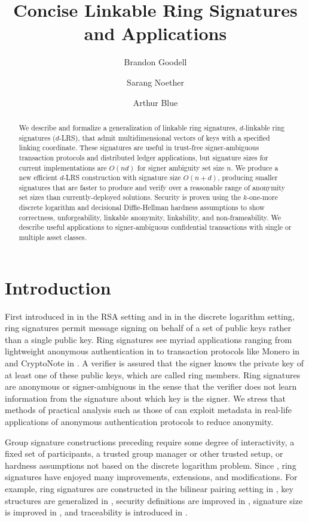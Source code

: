 \documentclass[draft]{llncs} %
\title{Concise Linkable Ring Signatures and Applications}
\institute{Monero Research Lab, \email{\{surae,sarang\}.noether@protonmail.com} \and Independent researcher, \email{randomrun@protonmail.com}}
\author{Brandon Goodell\inst{1} \and Sarang Noether\inst{1} \and Arthur Blue\inst{2}}
\begin{document}
\maketitle


\begin{abstract}
We describe and formalize a generalization of linkable ring signatures, $d$-linkable ring signatures ($d$-LRS), that admit multidimensional vectors of keys with a specified linking coordinate. These signatures are useful in trust-free signer-ambiguous transaction protocols and distributed ledger applications, but signature sizes for current implementations are $O(nd)$ for signer ambiguity set size $n$. We produce a new efficient $d$-LRS construction with signature size $O(n + d)$, producing smaller signatures that are faster to produce and verify over a reasonable range of anonymity set sizes than currently-deployed solutions. Security is proven using the $k$-one-more discrete logarithm and decisional Diffie-Hellman hardness assumptions to show correctness, unforgeability, linkable anonymity, linkability, and non-frameability. We describe useful applications to signer-ambiguous confidential transactions with single or multiple asset classes.
\end{abstract}


\section{Introduction}

First introduced in \cite{rivest} in the RSA setting and in \cite{liu} in the discrete logarithm setting, ring signatures permit message signing on behalf of a set of public keys rather than a single public key. Ring signatures see myriad applications ranging from lightweight anonymous authentication in \cite{yang2015lightweight} to transaction protocols like Monero in \cite{noether} and CryptoNote in \cite{van2013cryptonote}. A verifier is assured that the signer knows the private key of at least one of these public keys, which are called ring members. Ring signatures are anonymous or signer-ambiguous in the sense that the verifier does not learn information from the signature about which key is the signer. We stress that methods of practical analysis such as those of  \cite{moser2018empirical,quesnelle2017linkability} can exploit metadata in real-life applications of anonymous authentication protocols to reduce anonymity.

Group signature constructions preceding \cite{rivest,liu} require some degree of interactivity, a fixed set of participants, a trusted group manager or other trusted setup, or hardness assumptions not based on the discrete logarithm problem. Since \cite{rivest}, ring signatures have enjoyed many improvements, extensions, and modifications. For example, ring signatures are constructed in the bilinear pairing setting in \cite{zhang2002id}, key structures are generalized in \cite{abe20021}, security definitions are improved in \cite{bender}, signature size is improved in \cite{fujisaki2011sub,gu2018constant}, and traceability is introduced in \cite{fujisaki2007traceable}.
\end{document}
